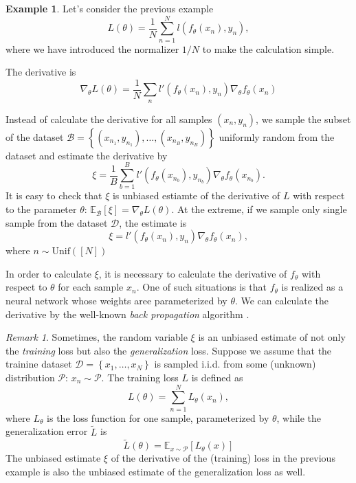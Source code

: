 \documentclass{amsart}
\theoremstyle{definition}
\newtheorem{example}[theorem]{Example}
\theoremstyle{remark}
\newtheorem{remark}[theorem]{Remark}
\numberwithin{equation}{section}
\begin{document}
\begin{example}
Let's consider the previous example
\begin{equation}
L(\theta) = \frac{1}{N}\sum_{n=1}^N l(f_\theta(x_n), y_n),
\end{equation}
where we have introduced the normalizer $1/N$ to make the calculation simple.

The derivative is
\begin{equation}
\nabla_{\theta}L(\theta) = \frac{1}{N}\sum_{n} l'(f_\theta(x_n), y_n) \nabla_{\theta}f_\theta(x_n)
\end{equation}

Instead of calculate the derivative for all samples $(x_n, y_n)$,
we sample the subset of the dataset $\mathcal{B} = \left\{(x_{n_1}, y_{n_1}), \ldots, (x_{n_B}, y_{n_B})\right\}$ uniformly random from the dataset and estimate the derivative by
\begin{equation}
\xi = \frac{1}{B} \sum_{b=1}^{B} l'(f_\theta(x_{n_b}), y_{n_b}) \nabla_{\theta}f_\theta(x_{n_b}).
\end{equation}
It is easy to check that $\xi$ is unbiased estiamte of the derivative of $L$ with respect to the parameter $\theta$: $\mathbb{E}_{\mathcal{B}}[\xi]=\nabla_{\theta}L(\theta)$.
At the extreme, if we sample only single sample from the dataset $\mathcal{D}$, the estimate is 
\begin{equation}
\xi = l'(f_\theta(x_n), y_n) \nabla_\theta f_\theta(x_n),
\end{equation}
where $n\sim \mathrm{Unif}([N])$

In order to calculate $\xi$, it is necessary to calculate the derivative of $f_\theta$
with respect to $\theta$ for each sample $x_n$. One of such situations is that $f_\theta$ is realized as a neural network whose weights aree parameterized by $\theta$. We can calculate the derivative by the well-known \textit{back propagation} algorithm \cite{rumelhart1988learning}.
\end{example}

\begin{remark}
Sometimes, the random variable $\xi$ is an unbiased estimate of not only the \textit{training} loss but also the \textit{generalization} loss.
Suppose we assume that the trainine dataset $\mathcal{D} = \left\{x_1, \ldots, x_N\right\}$ is sampled i.i.d. from some (unknown) distribution $\mathcal{P}$:
$x_n \sim \mathcal{P}$. The training loss $L$ is defined as
\begin{equation}
L(\theta) = \sum_{n=1}^{N} L_\theta(x_n),
\end{equation}
where $L_\theta$ is the loss function for one sample, parameterized by $\theta$,
while the generalization error $\tilde{L}$ is
\begin{equation}
\tilde{L}(\theta) = \mathbb{E}_{x\sim \mathcal{P}}\left[ L_\theta(x) \right]
\end{equation}
The unbiased estimate $\xi$ of the derivative of the (training) loss in the previous example is also the unbiased estimate of the generalization loss as well.
\end{remark}
\end{document}

